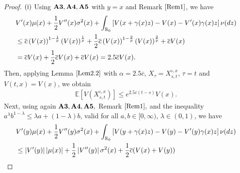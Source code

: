\documentclass[11pt]{article}
\theoremstyle{theorem}
\theoremstyle{definition}
\newcommand{\bR}{\mathbb{R}}
\newcommand{\1}{{\bf 1}}
\begin{document}
\begin{proof}
 $\textup{(i)}$ Using $\bf A3, A4, A5$ with $y=x$ and Remark $\ref{Rem1}$, we have
\begin{align*}
&V'(x)\mu (x) + \dfrac{1}{2}V''(x) \sigma^2(x) + \int_{\bR_0}\left[V(x+\gamma(x)z)-V(x)-V'(x)\gamma(x)z\right] \nu (dz)    \notag \\
& \leq \overline{c}\left(V(x)\right)^{1-\frac{1}{p}} \left(V(x)\right)^{\frac{1}{p}} + \dfrac{1}{2} \overline{c} \left(V(x)\right)^{1-\frac{2}{p}} \left(V(x)\right)^{\frac{2}{p}} + \overline{c} V(x) \\
& = \overline{c} V(x) +\dfrac{1}{2} \overline{c} V(x)+ \overline{c} V(x) = 2.5 \overline{c} V(x).
\end{align*}
 Then, applying Lemma $\ref{Lem2.2}$ with{ \color{black} $\alpha = 2.5 \overline{c} $, $X_{\tau}=X^{\iota, x}_{s, t}$, $\tau=t$ and $V(t,x)=V(x)$,} we obtain
\begin{align}
    \mathbb{E}\left[V(X^{\iota, x}_{s, t})\right] \leq e^{2.5 \overline{c}(t-s)}V(x).
    \label{i1}
\end{align}
Next, using again $\bf A3, A4, A5,$ Remark $\ref{Rem1},$ and the inequality $a^{\lambda} b^{1-\lambda} \le \lambda a+(1-\lambda)b$, valid for all $a, b \in [0, \infty)$, $\lambda \in (0,1)$, we have  
\begin{align*}
   & V'(y) \mu(x)+\dfrac{1}{2} V''(y) \sigma^2 (x) + \int_{\bR_0} \left[ V(y+\gamma(x)z)-V(y)-V'(y)\gamma(x)z\right] \nu (dz) \notag \\
   & \le |V'(y)| \, |\mu(x)|+\dfrac{1}{2} \left|V''(y) \right|\sigma^2 (x) +\dfrac{1}{2}  \overline{c} (V(x) + V(y)) \notag \\

\end{align*}
\end{proof}
\end{document}
